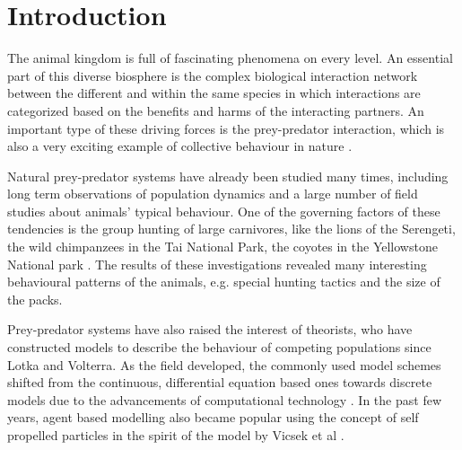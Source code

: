 \documentclass[12pt,a4paper,final]{iopart}
\begin{document}


\section{Introduction}

The animal kingdom is full of fascinating phenomena on every level. An essential part of this diverse biosphere is the complex biological interaction network between the different and within the same species in which interactions are categorized based on the benefits and harms of the interacting partners. An important type of these driving forces is the prey-predator interaction, which is also a very exciting example of collective behaviour in nature \cite{vicsek2012collective}.

Natural prey-predator systems have already been studied many times, including long term observations of population dynamics and a large number of field studies about animals' typical behaviour. One of the governing factors of these tendencies is the group hunting of large carnivores, like the lions of the Serengeti, the wild chimpanzees in the Tai National Park, the coyotes in the Yellowstone National park \cite{schaller1972serengeti, boesch1989hunting, gese2001territorial}. The results of these investigations revealed many interesting behavioural patterns of the animals, e.g. special hunting tactics and the size of the packs. 

Prey-predator systems have also raised the interest of theorists, who have constructed models to describe the behaviour of competing populations since Lotka and Volterra. As the field developed, the commonly used model schemes shifted from the continuous, differential equation based ones towards discrete models due to the advancements of computational technology \cite{pekalski2004short, antal2001critical, rozenfeld1999study}. In the past few years, agent based modelling also became popular using the concept of self propelled particles in the spirit of the model by Vicsek et al \cite{vicsek1995novel}.
\end{document}
